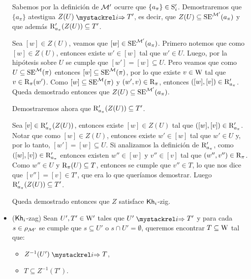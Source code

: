 \begin{demostracion}
\begin{itemize}
        Sabemos por la definición de $\modults'$ ocurre que $\{a_\pi\}\in\S'_i$. Demostraremos que $\{a_\pi\}$ 
        atestigua $Z(U) \ultsExecAgi T'$, es decir, que $Z(U) \subseteq \sexec^{\model'}(a_\pi)$ y que además 
        $\R'_{a_\pi}(Z(U)) \subseteq T'$.

        Sea $[w] \in Z(U)$, veamos que $[w] \in \sexec^{\model'}(a_\pi)$. Primero notemos que como $[w] \in Z(U)$, 
        entonces existe $w' \in [w]$ tal que $w' \in U$. Luego, por la hipótesis sobre $U$
        se cumple que $[w'] = [w] \subseteq U$. Pero veamos que como $U \subseteq \sexec^{\model}(\pi)$ entonces 
        $[w] \subseteq \sexec^{\model}(\pi)$, por lo que existe $v \in \W$ tal que $v \in \R_\pi(w')$. 
        Como $[w] \subseteq \sexec^{\model}(\pi)$ y $(w',v) \in \R_\pi$, entonces 
        $([w],[v]) \in \R'_{a_\pi}$. Queda demostrado entonces que $Z(U) \subseteq \sexec^{\model'}(a_\pi)$.
        
        Demostraremos ahora que $\R'_{a_\pi}(Z(U)) \subseteq T'$.

        Sea $[v] \in \R'_{a_\pi}(Z(U))$, entonces existe $[w] \in Z(U)$ tal que $([w],[v]) \in \R'_{a_\pi}$. Notar que 
        como $[w] \in Z(U)$, entonces existe $w' \in [w]$ tal que $w' \in U$ y, por lo tanto, $[w'] = [w] \subseteq U$. 
        Si analizamos la definición de $\R'_{a_\pi}$, como $([w],[v]) \in \R'_{a_\pi}$ entonces existen $w'' \in [w]$ y $v'' \in [v]$ 
        tal que $(w'',v'') \in \R_\pi$. Como $w'' \in U$ y $\R_\pi(U) \subseteq T$, entonces se cumple que $v'' \in T$, lo que nos dice 
        que $[v''] = [v] \in T'$, que era lo que queríamos demostrar. Luego $\R'_{a_\pi}(Z(U)) \subseteq T'$. 

        Queda demostrado entonces que $Z$ satisface $\khi$-zig.

        \item ($\khi$-zag) Sean $U', T' \in \W'$ tales que $U' \ultsExecAgi T'$ y para cada $s \in \rho_{\modults'}$ se cumple que 
        $s \subseteq U'$ o $s \cap U' = \emptyset$, queremos encontrar $T \subseteq \W$ tal que:
        \begin{multicols}{2}
            \begin{itemize}
                \item $Z^{-1}(U') \ultsExecAgi T$, 
                \item $T \subseteq Z^{-1}(T')$.
            \end{itemize}
        \end{multicols}
        

\end{itemize}
\end{demostracion}
